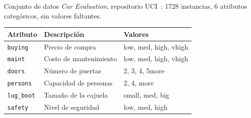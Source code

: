 \documentclass[10pt,aspectratio=169]{beamer}
\begin{document}
\begin{frame}{Conjunto de datos}
  \emph{Car Evaluation}, repositorio UCI~\cite{bohanec1988car}:
  \alert{1728 instancias}, 6 atributos categóricos, sin valores faltantes.

  \vspace{1.2em}
  \begin{ventana}[width=0.9\linewidth, before=\centering, left=0mm, right=0mm, top=3mm, bottom=3mm]
    \centering\small
    \renewcommand{\arraystretch}{1.25}
    \setlength{\tabcolsep}{2.5mm}
    \begin{tabular}{lll}
      \textbf{Atributo} & \textbf{Descripción} & \textbf{Valores} \\
      \midrule
      \texttt{buying}    & Precio de compra       & low, med, high, vhigh \\
      \texttt{maint}     & Costo de mantenimiento & low, med, high, vhigh \\
      \texttt{doors}     & Número de puertas      & 2, 3, 4, 5more \\
      \texttt{persons}   & Capacidad de personas  & 2, 4, more \\
      \texttt{lug\_boot} & Tamaño de la cajuela   & small, med, big \\
      \texttt{safety}    & Nivel de seguridad     & low, med, high \\
    \end{tabular}
  \end{ventana}
\end{frame}
\end{document}
